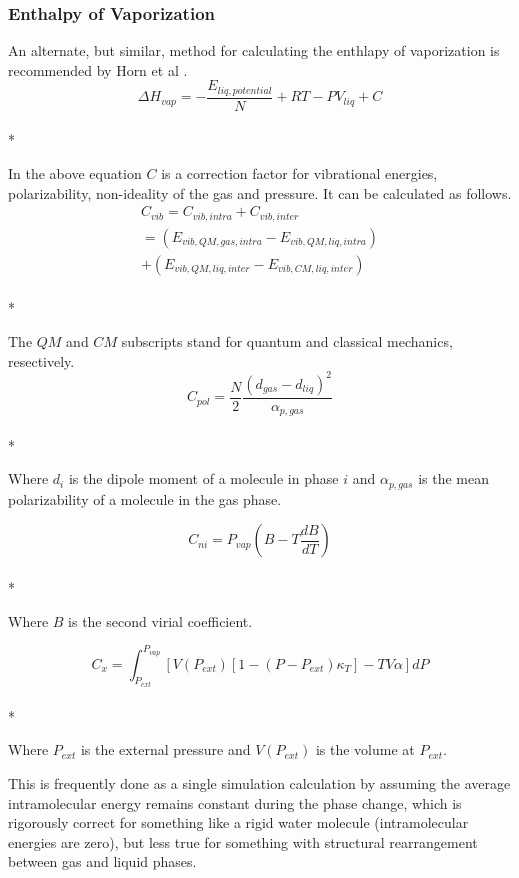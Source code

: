 \documentclass[9pt,bestpractices]{livecoms}
\begin{document}
\subsubsection{Enthalpy of Vaporization}
An alternate, but similar, method for calculating the enthlapy of vaporization is recommended by Horn et al \cite{horn}.
\begin{equation}\Delta H_{vap} = -\frac{E_{liq, potential}}{N} + R T - P V_{liq} + C\end{equation}\\*

In the above equation $C$ is a correction factor for vibrational energies, polarizability, non-ideality of the gas and pressure. It can be calculated as follows.
\begin{multline}
C_{vib} = C_{vib,intra} + C_{vib,inter} \\ = \left(E_{vib,QM,gas,intra} - E_{vib,QM,liq,intra}\right) \\ + \left(E_{vib,QM,liq,inter} - E_{vib,CM,liq,inter}\right)
\end{multline}\\*

The $QM$ and $CM$ subscripts stand for quantum and classical mechanics, resectively. 
\begin{equation}C_{pol} = \frac{N}{2} \frac{\left(d_{gas} - d_{liq}\right)^2}{\alpha_{p,gas}}\end{equation}\\*

Where $d_i$ is the dipole moment of a molecule in phase $i$ and $\alpha_{p,gas}$ is the mean polarizability of a molecule in the gas phase.

\begin{equation}C_{ni} = P_{vap} \left(B - T \frac{dB}{dT}\right)\end{equation}\\*

Where $B$ is the second virial coefficient.

\begin{equation}C_x = \int_{P_{ext}}^{P_{vap}} \left[V\left(P_{ext}\right)\left[1 - \left(P - P_{ext}\right) \kappa_T\right] - T V \alpha\right] dP\end{equation}\\*

Where $P_{ext}$ is the external pressure and $V\left(P_{ext}\right)$ is the volume at $P_{ext}$. 

This is frequently done as a single simulation calculation by assuming
the average intramolecular energy remains constant during the phase
change, which is rigorously correct for something like a rigid water
molecule (intramolecular energies are zero), but less true for
something with structural rearrangement between gas and liquid phases. 
\end{document}
